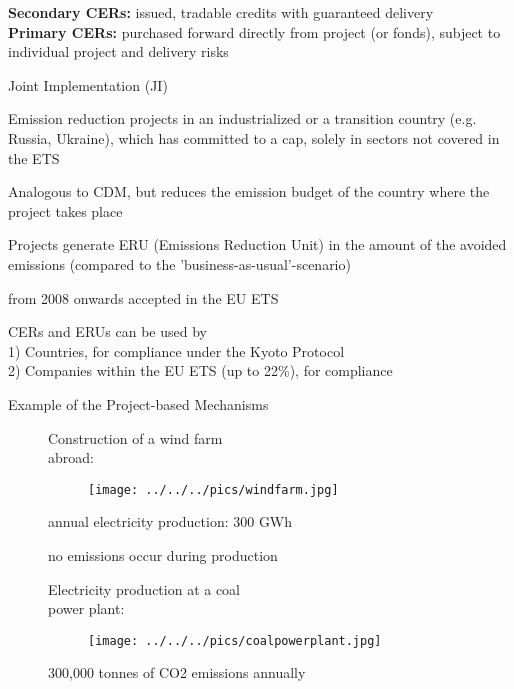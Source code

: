 
\textbf{Secondary CERs:} issued, tradable credits with guaranteed delivery \\
\textbf{Primary CERs:} purchased forward directly from project (or fonds), subject to individual project and delivery risks


{Joint Implementation (JI)}


	 Emission reduction projects in an industrialized or a transition country (e.g. Russia, Ukraine), which has committed to a cap, solely in sectors not covered in the ETS

	 Analogous to CDM, but reduces the emission budget of the country where the project takes place

	 Projects generate ERU (Emissions Reduction Unit) in the amount of the avoided emissions (compared to the 'business-as-usual'-scenario)

	 from 2008 onwards accepted in the EU ETS


CERs and ERUs can be used by \\
1) Countries, for compliance under the Kyoto Protocol \\
2) Companies within the EU ETS (up to 22\%), for compliance


{Example of the Project-based Mechanisms}
\begin{figure}[t]
\begin{minipage}[t]{0.475\textwidth}
Construction of a wind farm \\
abroad:
\vspace*{-0.2cm}
\begin{figure}[h!]
\centering
\texttt{[image: ../../../pics/windfarm.jpg]}
\end{figure}
\vspace*{-0.4cm}


	annual electricity production: 300 GWh

	no emissions occur during production


\end{minipage}
\begin{minipage}[t]{0.475\textwidth}
Electricity production at a coal \\
power plant:
\vspace*{-0.2cm}
\begin{figure}[h!]
\centering
\texttt{[image: ../../../pics/coalpowerplant.jpg]}
\end{figure}
\vspace*{-0.4cm}


	300,000 tonnes of CO2 emissions annually


\end{minipage}
\end{figure}

